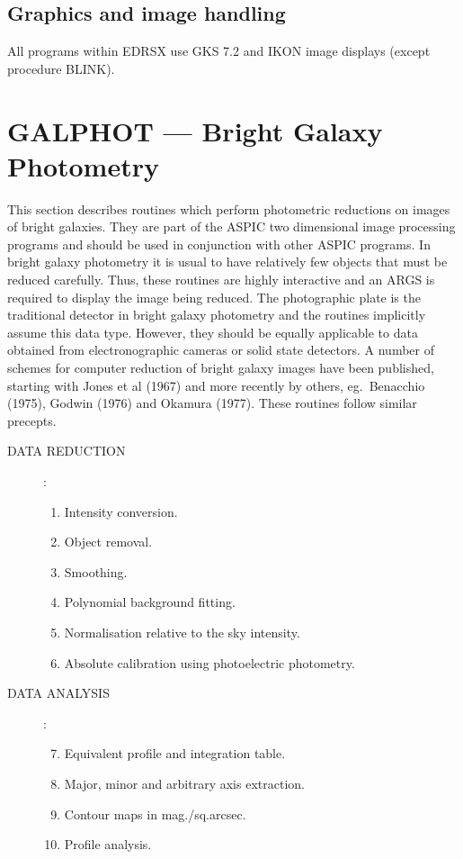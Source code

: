 \subsection {Graphics and image handling}
All programs within EDRSX use GKS 7.2 and IKON image displays (except
procedure BLINK).

\section {GALPHOT --- Bright Galaxy Photometry}

This section describes routines which perform photometric reductions on images
of bright galaxies.
They are part of the ASPIC two dimensional image processing programs and should
be used in conjunction with other ASPIC programs.
In bright galaxy photometry it is usual to have relatively few objects that must
be reduced carefully.
Thus, these routines are highly interactive and an ARGS is required to display
the image being reduced.
The photographic plate is the traditional detector in bright galaxy photometry
and the routines implicitly assume this data type.
However, they should be equally applicable to data obtained from
electronographic cameras or solid state detectors.
A number of schemes for computer reduction of bright galaxy images have been
published, starting with Jones et al (1967) and more recently by others, eg.\
Benacchio (1975), Godwin (1976) and Okamura (1977).
These routines follow similar precepts.
\begin{description}
\item [DATA REDUCTION]:
\begin{enumerate}
\item Intensity conversion.
\item Object removal.
\item Smoothing.
\item Polynomial background fitting.
\item Normalisation relative to the sky intensity.
\item Absolute calibration using photoelectric photometry.
\end{enumerate}
\item [DATA ANALYSIS]:
\begin{enumerate}
\setcounter{enumi}{6}
\item Equivalent profile and integration table.
\item Major, minor and arbitrary axis extraction.
\item Contour maps in mag./sq.arcsec.
\item Profile analysis.
\end{enumerate}
\end{description}
